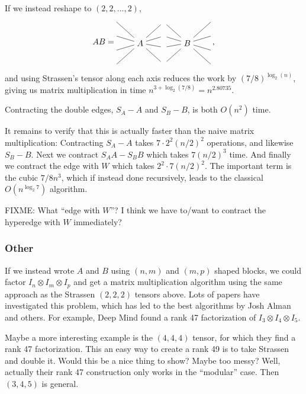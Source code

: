 If we instead reshape to $(2,2,\dots,2)$,
\[
AB = 
   \begin{tikzpicture}[baseline=-1em, y=1.7em]
      \node (P1) at (0,-.5) {$A$};
      \node (A) at (1,1) {};
      \node (P2) at (2,-.5) {$B$};
      \node (B) at (1,0) {};
      \node (C) at (1,-.8) {};
      \node (D) at (1,-2) {};
      \draw (-1,1) -- (P1) -- (A) -- (P2) -- (3, 1);
      \draw (-1,0) -- (P1) -- (B) -- (P2) -- (3, 0);
      \draw (-1,-1) -- (P1) -- (C) -- (P2) -- (3, -1);
      \draw (-1,-2) -- (P1) -- (D) -- (P2) -- (3, -2);
   \end{tikzpicture}
   \,,
\]
and using Strassen's tensor along each axis reduces the work by $(7/8)^{\log_2(n)}$, giving us matrix multiplication in time $n^{3 + \log_2(7/8)} = n^{2.80735}$.


\newpage

Contracting the double edges, $S_A - A$ and $S_B - B$, is both $O(n^2)$ time.

It remains to verify that this is actually faster than the naive matrix multiplication:
Contracting $S_A - A$ takes $7\cdot 2^2 (n/2)^2$ operations, and likewise $S_B - B$.
Next we contract $S_AA - S_BB$ which takes $7(n/2)^3$ time.
And finally we contract the edge with $W$ which takes $2^2 \cdot 7 (n/2)^2$.
The important term is the cubic $7/8 n^3$, which if instead done recursively, leads to the classical $O(n^{\log_2 7})$ algorithm.

FIXME: What ``edge with $W$''? I think we have to/want to contract the hyperedge with $W$ immediately?

\subsubsection{Other}

If we instead wrote $A$ and $B$ using $(n,m)$ and $(m,p)$ shaped blocks, we could factor $I_n\otimes I_m\otimes I_p$ and get a matrix multiplication algorithm using the same approach as the Strassen $(2,2,2)$ tensors above.
Lots of papers have investigated this problem, which has led to the best algorithms by Josh Alman and others.
For example, Deep Mind found a rank 47 factorization of $I_3\otimes I_4\otimes I_5$.

Maybe a more interesting example is the $(4,4,4)$ tensor, for which they find a rank 47 factorization.
This an easy way to create a rank 49 is to take Strassen and double it.
Would this be a nice thing to show? Maybe too messy?
Well, actually their rank 47 construction only works in the ``modular'' case. Then $(3,4,5)$ is general.



